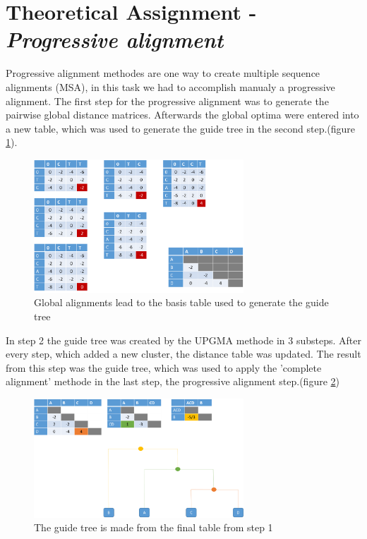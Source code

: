 \documentclass[%
   10pt,              %
   nenglish,           %
   a4paper,           %
   DIV11,             %
]{scrartcl}%
\begin{document}
\section*{Theoretical Assignment - \textsl{Progressive alignment}}
Progressive alignment methodes are one way to create multiple sequence alignments (MSA), in this task we had to accomplish manualy a progressive alignment. The first step for the progressive alignment was to generate the pairwise global distance matrices. Afterwards the global optima were entered into a new table, which was used to generate the guide tree in the second step.(figure \ref{DP2}).
\begin{figure}[ht]
        \centering
	\includegraphics[width=0.7\textwidth]{Img/Exercise2-DP-Matrix.png}
	\caption{ Global alignments lead to the basis table used to generate the guide tree}
	\label{DP2}
\end{figure}

In step 2 the guide tree was created by the UPGMA methode in 3 substeps. After every step, which added a new cluster, the distance table was updated. The result from this step was the guide tree, which was used to apply the 'complete alignment' methode in the last step, the progressive alignment step.(figure \ref{guidetree2})


\begin{figure}[ht]
        \centering
	\includegraphics[width=0.7\textwidth]{Img/Exercise2-Guidetree.png}
	\caption{ The guide tree is made from the final table from step 1}
	\label{guidetree2}
\end{figure}
\end{document}
